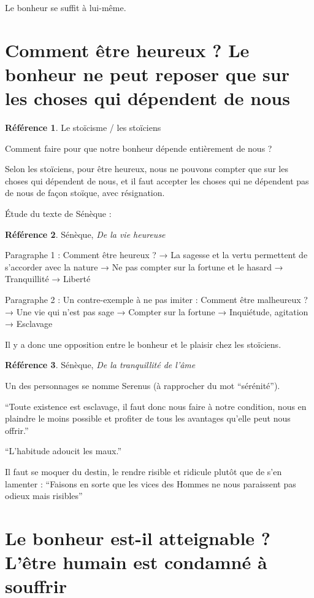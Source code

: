 \documentclass[french]{book}
\theoremstyle{definition}
\newtheorem*{refe}{Référence}
\begin{document}
Le bonheur se suffit à lui-même.

\section{Comment être heureux ? Le bonheur ne peut reposer que sur les choses qui dépendent de nous}

\begin{refe}
	Le stoïcisme / les stoïciens
\end{refe}

Comment faire pour que notre bonheur dépende entièrement de nous ?

Selon les stoïciens, pour être heureux, nous ne pouvons compter que sur les choses qui dépendent de nous, et il faut accepter les choses qui ne dépendent pas de nous de façon stoïque, avec résignation.

Étude du texte de Sénèque :

\begin{refe}
	Sénèque, \textit{De la vie heureuse}
\end{refe}

Paragraphe 1 : Comment être heureux ?
→ La sagesse et la vertu permettent de s’accorder avec la nature
→ Ne pas compter sur la fortune et le hasard
→ Tranquillité
→ Liberté

Paragraphe 2 : Un contre-exemple à ne pas imiter : Comment être malheureux ?
→ Une vie qui n’est pas sage
→ Compter sur la fortune
→ Inquiétude, agitation
→ Esclavage

Il y a donc une opposition entre le bonheur et le plaisir chez les stoïciens.



\begin{refe}
	Sénèque, \textit{De la tranquillité de l’âme}
\end{refe}
Un des personnages se nomme Serenus (à rapprocher du mot “sérénité”).

“Toute existence est esclavage, il faut donc nous faire à notre condition, nous en plaindre le moins possible et profiter de tous les avantages qu’elle peut nous offrir.”

“L’habitude adoucit les maux.”

Il faut se moquer du destin, le rendre risible et ridicule plutôt que de s’en lamenter :
“Faisons en sorte que les vices des Hommes ne nous paraissent pas odieux mais risibles”

\section{Le bonheur est-il atteignable ? L’être humain est condamné à souffrir}
\end{document}
